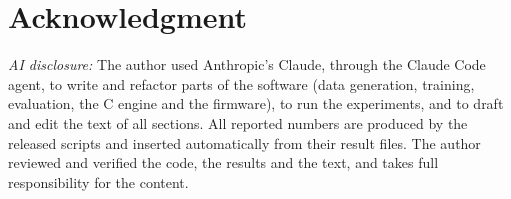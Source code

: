 \documentclass[journal]{IEEEtran}
\begin{document}
\section*{Acknowledgment}
\emph{AI disclosure:} The author used Anthropic's Claude, through the Claude Code agent, to write and refactor parts of the software (data generation, training, evaluation, the C engine and the firmware), to run the experiments, and to draft and edit the text of all sections. All reported numbers are produced by the released scripts and inserted automatically from their result files. The author reviewed and verified the code, the results and the text, and takes full responsibility for the content.



\end{document}

